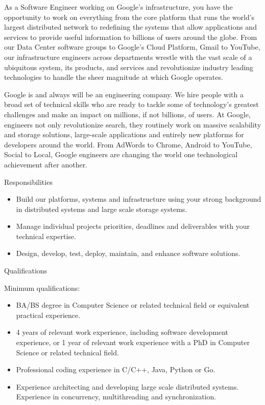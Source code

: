 \begin{sloppypar}
\begin{ssmall}
 

As a Software Engineer working on Google's infrastructure, you have the opportunity to work on everything from the core platform that runs the world's largest distributed network to redefining the systems that allow applications and services to provide useful information to billions of users around the globe. From our Data Center software groups to Google's Cloud Platform, Gmail to YouTube, our infrastructure engineers across departments wrestle with the vast scale of a ubiquitous system, its products, and services and revolutionize industry leading technologies to handle the sheer magnitude at which Google operates.

 
\pagebreak
Google is and always will be an engineering company. We hire people with a broad set of technical skills who are ready to tackle some of technology's greatest challenges and make an impact on millions, if not billions, of users. At Google, engineers not only revolutionize search, they routinely work on massive scalability and storage solutions, large-scale applications and entirely new platforms for developers around the world. From AdWords to Chrome, Android to YouTube, Social to Local, Google engineers are changing the world one technological achievement after another.


\vspace{1mm}
Responsibilities

\begin{itemize}
\setlength\itemsep{0mm}
\item Build our platforms, systems and infrastructure using your strong background in distributed systems and large scale storage systems.
\item Manage individual projects priorities, deadlines and deliverables with your technical expertise.
\item Design, develop, test, deploy, maintain, and enhance software solutions.
\end{itemize}

Qualifications

Minimum qualifications:

\begin{itemize}
\setlength\itemsep{0mm}
\item BA/BS degree in Computer Science or related technical field or equivalent practical experience.
\item 4 years of relevant work experience, including software development experience, or 1 year of relevant work experience with a PhD in Computer Science or related technical field.
\item Professional coding experience in C/C++, Java, Python or Go.
\item  Experience architecting and developing large scale distributed systems. Experience in concurrency, multithreading and synchronization.
\end{itemize}
 


\end{ssmall}
\end{sloppypar}

